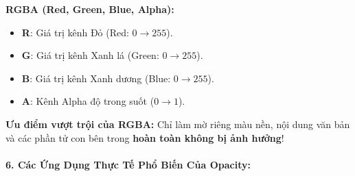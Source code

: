 \begin{conceptBox}
\textbf{RGBA (Red, Green, Blue, Alpha):}
\begin{itemize}[leftmargin=1.5em, itemsep=2pt, parsep=0pt]
    \item \textbf{R}: Giá trị kênh Đỏ (Red: $0 \rightarrow 255$).
    \item \textbf{G}: Giá trị kênh Xanh lá (Green: $0 \rightarrow 255$).
    \item \textbf{B}: Giá trị kênh Xanh dương (Blue: $0 \rightarrow 255$).
    \item \textbf{A}: Kênh Alpha độ trong suốt ($0 \rightarrow 1$).
\end{itemize}
\par\vspace{4pt}
\textbf{Ưu điểm vượt trội của RGBA:} Chỉ làm mờ riêng màu nền, nội dung văn bản và các phần tử con bên trong \textbf{hoàn toàn không bị ảnh hưởng}!
\end{conceptBox}

\paragraph{6. Các Ứng Dụng Thực Tế Phổ Biến Của Opacity:}

